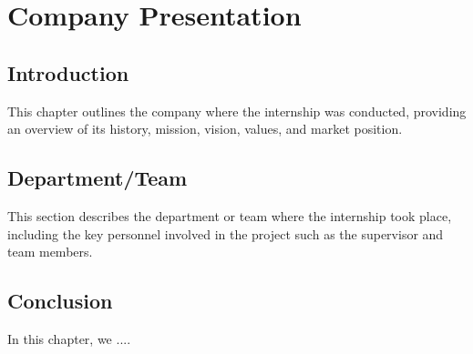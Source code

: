 \chapter{Company Presentation}
\label{chap:companypres}

\section*{Introduction}
    This chapter outlines the company where the internship was conducted, providing an overview of its history, mission, vision, values, and market position. 

\section*{Department/Team}
    This section describes the department or team where the internship took place, including the key personnel involved in the project such as the supervisor and team members.

\section*{Conclusion}
    In this chapter, we ....